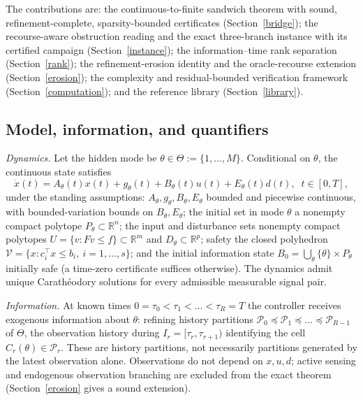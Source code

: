 \documentclass[10pt,twocolumn]{article}
\theoremstyle{plain}
\theoremstyle{definition}
\theoremstyle{remark}
\begin{document}
The contributions are: the continuous-to-finite sandwich theorem with sound,
refinement-complete, sparsity-bounded certificates (Section~\ref{bridge});
the recourse-aware obstruction reading and the exact three-branch instance
with its certified campaign (Section~\ref{instance}); the
information--time rank separation (Section~\ref{rank}); the refinement-erosion
identity and the oracle-recourse extension (Section~\ref{erosion}); the
complexity and residual-bounded verification framework
(Section~\ref{computation}); and the reference library
(Section~\ref{library}).

\subsection{Model, information, and quantifiers}\label{model}

\emph{Dynamics.} Let the hidden mode be
\(\theta \in \Theta := \{1,\dots,M\}\). Conditional on \(\theta\), the
continuous state satisfies
\[
\dot x(t) = A_\theta(t)x(t) + g_\theta(t) + B_\theta(t)u(t) + E_\theta(t)d(t),
\;\; t \in [0,T],
\]
under the standing assumptions: \(A_\theta, g_\theta, B_\theta, E_\theta\)
bounded and piecewise continuous, with bounded-variation bounds on
\(B_\theta, E_\theta\); the initial set in mode \(\theta\) a nonempty compact
polytope \(P_\theta \subset \mathbb{R}^n\); the input and disturbance sets
nonempty compact polytopes \(U = \{v : Fv \le f\} \subset \mathbb{R}^m\) and
\(D_\theta \subset \mathbb{R}^p\); safety the closed polyhedron
\(\mathcal{V} = \{x : c_i^\top x \le b_i,\ i = 1,\dots,s\}\); and the initial
information state
\(B_0 = \bigcup_{\theta} \{\theta\} \times P_\theta\) initially safe (a
time-zero certificate suffices otherwise). The dynamics admit unique
Carath\'eodory solutions for every admissible measurable signal pair.

\emph{Information.} At known times
\(0 = \tau_0 < \tau_1 < \dots < \tau_R = T\) the controller receives
exogenous information about \(\theta\): refining history partitions
\(\mathcal{P}_0 \preceq \mathcal{P}_1 \preceq \dots \preceq \mathcal{P}_{R-1}\)
of \(\Theta\), the observation history during
\(I_r = [\tau_r, \tau_{r+1})\) identifying the cell \(C_r(\theta) \in
\mathcal{P}_r\). These are history partitions, not necessarily partitions
generated by the latest observation alone. Observations do not depend on
\(x, u, d\); active sensing and endogenous observation branching are excluded
from the exact theorem (Section~\ref{erosion} gives a sound extension).
\end{document}
